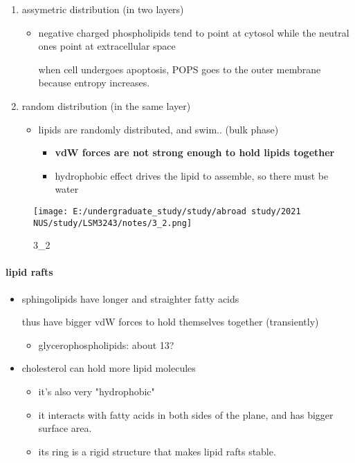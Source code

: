 \documentclass[]{article}
\let\oldparagraph\paragraph
\renewcommand{\paragraph}[1]{\oldparagraph{#1}\mbox{}}
\begin{document}
\begin{enumerate}
\def\labelenumi{\arabic{enumi}.}
\item
  assymetric distribution (in two layers)

  \begin{itemize}
  \item
    negative charged phospholipids tend to point at cytosol while the
    neutral ones point at extracellular space

     when cell undergoes apoptosis, POPS goes to the outer membrane because entropy increases.
  \end{itemize}
\item
  random distribution (in the same layer)

  \begin{itemize}
  \item
    lipids are randomly distributed, and swim.. (bulk phase)

    \begin{itemize}
    \item
      \textbf{vdW forces are not strong enough to hold lipids together}
    \item
      hydrophobic effect drives the lipid to assemble, so there must be
      water
    \end{itemize}
  \end{itemize}
\end{enumerate}

\begin{figure}
\centering
\texttt{[image: E:/undergraduate\_study/study/abroad study/2021 NUS/study/LSM3243/notes/3\_2.png]}
\caption{3\_2}
\end{figure}

\hypertarget{lipid-rafts}{%
\paragraph{lipid rafts}\label{lipid-rafts}}

\begin{itemize}
\item
  sphingolipids have longer and straighter fatty acids

  thus have bigger vdW forces to hold themselves together (transiently)

  \begin{itemize}
  \item
    glycerophospholipids: about 13?
  \end{itemize}
\item
  cholesterol can hold more lipid molecules

  \begin{itemize}
  \item
    it's also very "hydrophobic"
  \item
    it interacts with fatty acids in both sides of the plane, and has
    bigger surface area.
  \item
    its ring is a rigid structure that makes lipid rafts stable.
  \end{itemize}
\end{itemize}
\end{document}
